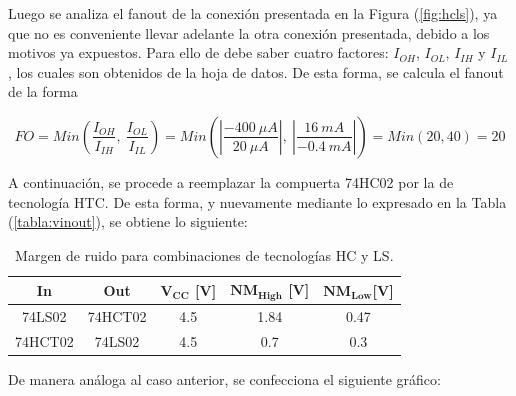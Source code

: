 Luego se analiza el fanout de la conexión presentada en la Figura (\ref{fig:hcls}), ya que no es conveniente llevar adelante la otra conexión presentada, debido a los motivos ya expuestos. Para ello de debe saber cuatro factores: $I_{OH}$, $I_{OL}$, $I_{IH}$ y $I_{IL}$, los cuales son obtenidos de la hoja de datos. De esta forma, se calcula el fanout de la forma

\begin{equation*}
	FO = Min \left( \frac{I_{OH}}{I_{IH}}, \ \frac{I_{OL}}{I_{IL}} \right) = Min \left( \left| \frac{-400 \ \mu A}{20 \ \mu A} \right|, \ \left| \frac{16 \ mA}{-0.4 \ mA}\right| \right) = Min \left( 20 , 40 \right) = 20
\end{equation*}

A continuación, se procede a reemplazar la compuerta 74HC02 por la de tecnología HTC. De esta forma, y nuevamente mediante lo expresado en la Tabla (\ref{tabla:vinout}), se obtiene lo siguiente:

\begin{table}[H]
\centering
\begin{tabular}{|c|c|c|c|c|}
\hline
\textbf{In} & \textbf{Out} & $\mathbf{V_{CC}}$ \textbf{[V]} & $\mathbf{NM_{High}}$ \textbf{[V]} & $\mathbf{NM_{Low}} $\textbf{[V]} \\ \hline
74LS02      & 74HCT02       & 4.5                            & 1.84                              & 0.47                              \\ 
74HCT02      & 74LS02       & 4.5                            & 0.7                             & 0.3     		                    \\ \hline
\end{tabular}
\caption{Margen de ruido para combinaciones de tecnologías HC y LS.}
\label{tabla:nm2}
\end{table}

De manera análoga al caso anterior, se confecciona el siguiente gráfico:


